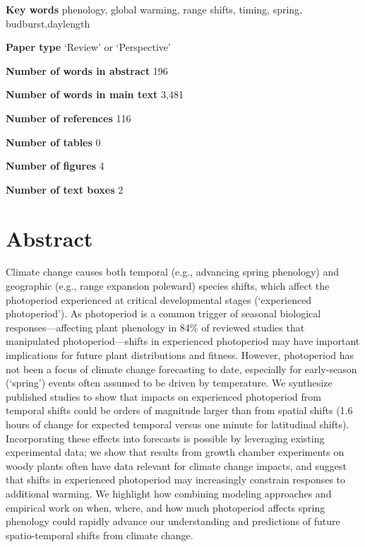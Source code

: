 \documentclass{article}
\begin{document}
\textbf{Key words} phenology, global warming, range shifts, timing, spring, budburst,daylength 

\textbf{Paper type} `Review' or `Perspective'

\textbf{Number of words in abstract} 196

\textbf{Number of words in main text} 3,481

\textbf{Number of references} 116

\textbf{Number of tables} 0

\textbf{Number of figures} 4

\textbf{Number of text boxes} 2


\newpage
\linenumbers
\section*{Abstract}
Climate change causes both temporal (e.g., advancing spring phenology) and geographic (e.g., range expansion poleward) species shifts, which affect the photoperiod experienced at critical developmental stages (`experienced photoperiod'). As photoperiod is a common trigger of seasonal biological responses---affecting plant phenology in 84\% of reviewed studies that manipulated photoperiod---shifts in experienced photoperiod may have important implications for future plant distributions and fitness. However, photoperiod has not been a focus of climate change forecasting to date, especially for early-season (`spring') events often assumed to be driven by temperature. We synthesize published studies to show that impacts on experienced photoperiod from temporal shifts could be orders of magnitude larger than from spatial shifts (1.6 hours of change for expected temporal versus one minute for latitudinal shifts). Incorporating these effects into forecasts is possible by leveraging existing experimental data; we show that results from growth chamber experiments on woody plants often have data relevant for climate change impacts, and suggest that shifts in experienced photoperiod may increasingly constrain responses to additional warming. We highlight how combining modeling approaches and empirical work on when, where, and how much photoperiod affects spring phenology could rapidly advance our understanding and predictions of future spatio-temporal shifts from climate change. 
\end{document}
